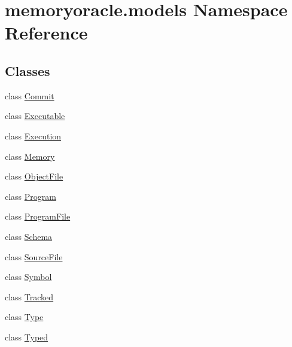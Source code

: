\hypertarget{namespacememoryoracle_1_1models}{}\section{memoryoracle.\+models Namespace Reference}
\label{namespacememoryoracle_1_1models}
\subsection*{Classes}
\begin{DoxyCompactItemize}
\item 
class \hyperlink{classmemoryoracle_1_1models_1_1Commit}{Commit}
\item 
class \hyperlink{classmemoryoracle_1_1models_1_1Executable}{Executable}
\item 
class \hyperlink{classmemoryoracle_1_1models_1_1Execution}{Execution}
\item 
class \hyperlink{classmemoryoracle_1_1models_1_1Memory}{Memory}
\item 
class \hyperlink{classmemoryoracle_1_1models_1_1ObjectFile}{Object\+File}
\item 
class \hyperlink{classmemoryoracle_1_1models_1_1Program}{Program}
\item 
class \hyperlink{classmemoryoracle_1_1models_1_1ProgramFile}{Program\+File}
\item 
class \hyperlink{classmemoryoracle_1_1models_1_1Schema}{Schema}
\item 
class \hyperlink{classmemoryoracle_1_1models_1_1SourceFile}{Source\+File}
\item 
class \hyperlink{classmemoryoracle_1_1models_1_1Symbol}{Symbol}
\item 
class \hyperlink{classmemoryoracle_1_1models_1_1Tracked}{Tracked}
\item 
class \hyperlink{classmemoryoracle_1_1models_1_1Type}{Type}
\item 
class \hyperlink{classmemoryoracle_1_1models_1_1Typed}{Typed}
\end{DoxyCompactItemize}
